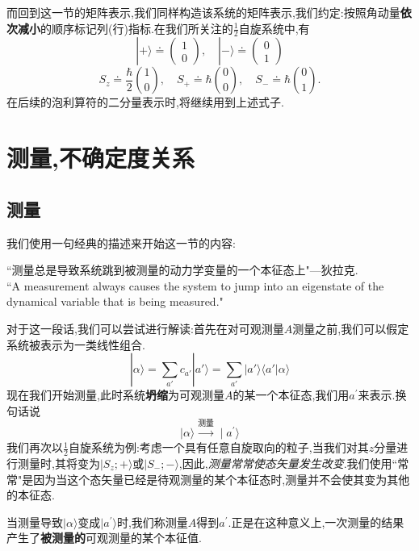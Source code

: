 \documentclass[lang=cn,newtx,10pt,scheme=chinese,thmcnt=section]{elegantbook}
\begin{document}
而回到这一节的矩阵表示,我们同样构造该系统的矩阵表示,我们约定:按照角动量\textbf{依次减小}的顺序标记列(行)指标.在我们所关注的$\frac12$自旋系统中,有
\begin{equation}
	|+\rangle\doteq\begin{pmatrix}1\\0\end{pmatrix},\quad|-\rangle\doteq\begin{pmatrix}0\\1\end{pmatrix}
\end{equation}
\begin{equation}
	S_z\doteq\frac{\hbar}{2}\binom{1}{0},\quad S_+\doteq\hbar\binom{0}{0},\quad S_-\doteq\hbar\binom{0}{1}.
\end{equation}
在后续的泡利算符的二分量表示时,将继续用到上述式子.
\section{测量,不确定度关系}
\subsection*{测量}
我们使用一句经典的描述来开始这一节的内容:
\begin{note}
	``测量总是导致系统跳到被测量的动力学变量的一个本征态上"---狄拉克.\\
	``A measurement always causes the system to jump into an eigenstate of the dynamical variable that is being measured."
\end{note}
对于这一段话,我们可以尝试进行解读:首先在对可观测量$A$测量之前,我们可以假定系统被表示为一类线性组合.
\begin{equation}
	|\alpha\rangle = \sum_{a'}c_{a'} | a' \rangle = \sum_{a'} | a' \rangle \langle a' | \alpha\rangle 
\end{equation}
现在我们开始测量,此时系统\textbf{坍缩}为可观测量$A$的某一个本征态,我们用$a^{'}$来表示.换句话说
\begin{equation}\label{eq1.3.1}
	|\alpha\rangle\xrightarrow{\text{测量}}\mid a^{\prime}\rangle 
\end{equation}
我们再次以$\frac12$自旋系统为例:考虑一个具有任意自旋取向的粒子,当我们对其$z$分量进行测量时,其将变为$|S_z;+\rangle$或$|S_-;-\rangle$,因此,\textit{测量常常使态矢量发生改变}.我们使用``常常"是因为当这个态矢量已经是待观测量的某个本征态时,测量并不会使其变为其他的本征态.

当测量导致$|\alpha\rangle$变成$|a^{\prime}\rangle$时,我们称测量$A$得到$a^{\prime}$.正是在这种意义上,一次测量的结果产生了\textbf{被测量的}可观测量的某个本征值.
\end{document}
